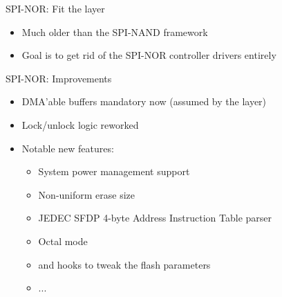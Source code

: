 \documentclass[aspectratio=169,obeyspaces,spaces,hyphens,dvipsnames]{beamer}
\begin{document}
\begin{frame}{SPI-NOR: Fit the {\bf{}} layer}
  \begin{itemize}
  \item Much older than the SPI-NAND framework
    \vfill
  \vfill
  \item Goal is to get rid of the SPI-NOR controller drivers entirely
  \end{itemize}
\end{frame}

\begin{frame}{SPI-NOR: Improvements}
  \begin{itemize}
  \item DMA'able buffers mandatory now (assumed by the 
    layer)
    \vfill
  \item Lock/unlock logic reworked
    \vfill
  \item Notable new features:
    \begin{itemize}
    \item System power management support
    \item Non-uniform erase size
    \item JEDEC SFDP 4-byte Address Instruction Table parser
    \item Octal mode
    \item {} and  hooks to
      tweak the flash parameters
    \item ...
    \end{itemize}
  \end{itemize}
\end{frame}
\end{document}
